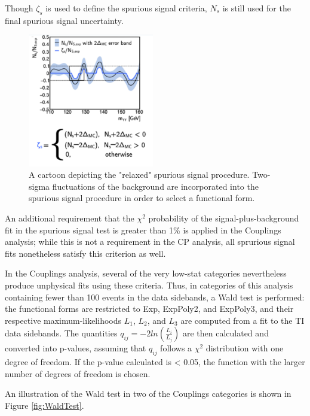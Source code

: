 Though $\zeta_{s}$ is used to define the spurious signal criteria, $N_{s}$ is still used for the final spurious signal uncertainty. 

\begin{figure}
\centering
\includegraphics[width=0.49\textwidth]{figures/sigbkgparam/SSRelaxed.png}
\caption{A cartoon depicting the "relaxed" spurious signal procedure. Two-sigma fluctuations of the background are incorporated into the spurious signal procedure in order to select a functional form.}
\label{fig:SSrelaxed}
\end{figure} 


An additional requirement that the $\chi^{2}$ probability of the signal-plus-background fit in the spurious signal test is greater than 1\% is applied in the Couplings analysis; while this is not a requirement in the CP analysis, all sprurious signal fits nonetheless satisfy this criterion as well.

In the Couplings analysis, several of the very low-stat categories nevertheless produce unphysical fits using these criteria. Thus, in categories of this analysis containing fewer than 100 events in the data sidebands, a Wald test is performed: the functional forms are restricted to Exp, ExpPoly2, and ExpPoly3, and their respective maximum-likelihoods $L_{1}$, $L_{2}$, and $L_{3}$ are computed from a fit to the TI data sidebands. The quantities $q_{ij} = -2 ln(\frac{L_{i}}{L_{j}})$ are then calculated and converted into p-values, assuming that $q_{ij}$ follows a $\chi^{2}$ distribution with one degree of freedom. If the p-value calculated is < 0.05, the function with the larger number of degrees of freedom is chosen. 

An illustration of the Wald test in two of the Couplings categories is shown in Figure \ref{fig:WaldTest}.


